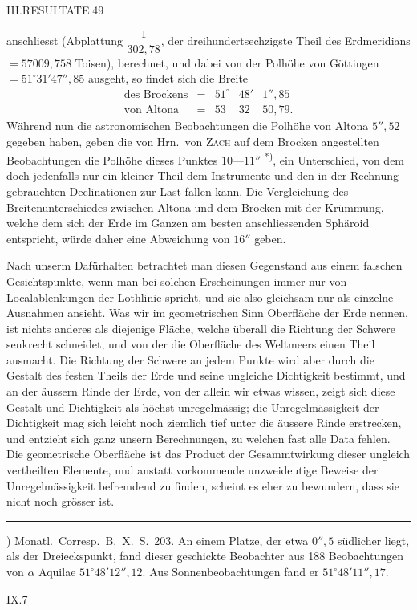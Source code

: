 \clearpage
\noindent\mbox{}\hfill III.\quad RESULTATE.\hfill 49\par
\noindent{} anschliesst (Abplattung $\dfrac1{302{,}78}$, der dreihundertsechzigste Theil des Erdmeridians $=57009{,}758$ Toisen), berechnet, und dabei von der Polhöhe von Göttingen $=51^\circ31'47''{,}85$ ausgeht, so findet sich die Breite
\[
\begin{array}{lcrrr}
\text{des Brockens}&=&51^\circ&48'&1''{,}85\\
\text{von Altona}&=&53&32&50{,}79.
\end{array}
\]
Während nun die astronomischen Beobachtungen die Polhöhe von Altona $5''{,}52$  gegeben haben, geben die von Hrn.\ von \textsc{Zach} auf dem Brocken angestellten Beobachtungen die Polhöhe dieses Punktes $10\text{—}11''$ \textsuperscript{*)}, ein Unterschied, von dem doch jedenfalls nur ein kleiner Theil dem Instrumente und den in der Rechnung gebrauchten Declinationen zur Last fallen kann. Die Vergleichung des Breitenunterschiedes zwischen Altona und dem Brocken mit der Krümmung, welche dem sich der Erde im Ganzen am besten anschliessenden Sphäroid entspricht, würde daher eine Abweichung von $16''$ geben.

Nach unserm Dafürhalten betrachtet man diesen Gegenstand aus einem falschen Gesichtspunkte, wenn man bei solchen Erscheinungen immer nur von Localablenkungen der Lothlinie spricht, und sie also gleichsam nur als einzelne Ausnahmen ansieht. Was wir im geometrischen Sinn Oberfläche der Erde nennen, ist nichts anderes als diejenige Fläche, welche überall die Richtung der Schwere senkrecht schneidet, und von der die Oberfläche des Weltmeers einen Theil ausmacht. Die Richtung der Schwere an jedem Punkte wird aber durch die Gestalt des festen Theils der Erde und seine ungleiche Dichtigkeit bestimmt, und an der äussern Rinde der Erde, von der allein wir etwas wissen, zeigt sich diese Gestalt und Dichtigkeit als höchst unregelmässig; die Unregelmässigkeit der Dichtigkeit mag sich leicht noch ziemlich tief unter die äussere Rinde erstrecken, und entzieht sich ganz unsern Berechnungen, zu welchen fast alle Data fehlen. Die geometrische Oberfläche ist das Product der Gesammtwirkung dieser ungleich vertheilten Elemente, und anstatt vorkommende unzweideutige Beweise der Unregelmässigkeit befremdend zu finden, scheint es eher zu bewundern, dass sie nicht noch grösser ist.
\par\noindent\rule{.25\textwidth}{.4pt}\par
{\footnotesize *) Monatl.\ Corresp.\ B.\ X.\ S.\ 203. An einem Platze, der etwa $0''{,}5$ südlicher liegt, als der Dreieckspunkt, fand dieser geschickte Beobachter aus 188 Beobachtungen von $\alpha$ Aquilae $51^\circ48'12''{,}12$. Aus Sonnenbeobachtungen fand er $51^\circ48'11''{,}17$.\par}
\noindent IX.\hfill 7\par

